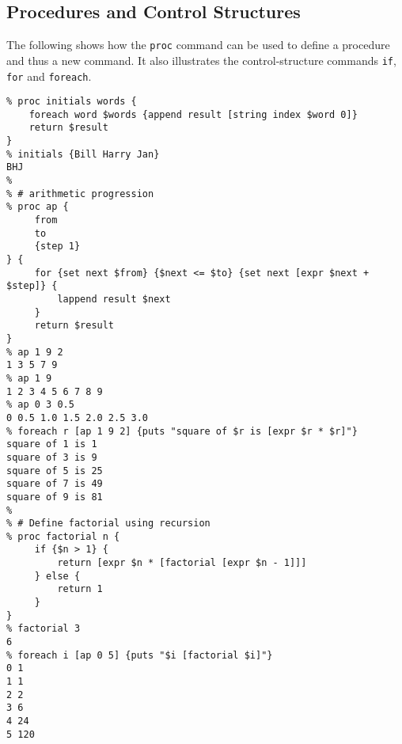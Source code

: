 \subsection{Procedures and Control Structures}
    \label{tcl-log-control}

The following shows how the 
  \texttt{proc} command can be used to define a procedure and thus
  a new command. It also illustrates the control-structure commands 
  \texttt{if}, 
  \texttt{for} and 
  \texttt{foreach}.
  \begin{verbatim}
% proc initials words {
    foreach word $words {append result [string index $word 0]}
    return $result
}
% initials {Bill Harry Jan}
BHJ
% 
% # arithmetic progression
% proc ap {
     from
     to
     {step 1}
} {
     for {set next $from} {$next <= $to} {set next [expr $next + $step]} {
         lappend result $next
     }
     return $result
}
% ap 1 9 2
1 3 5 7 9
% ap 1 9
1 2 3 4 5 6 7 8 9
% ap 0 3 0.5
0 0.5 1.0 1.5 2.0 2.5 3.0
% foreach r [ap 1 9 2] {puts "square of $r is [expr $r * $r]"}
square of 1 is 1
square of 3 is 9
square of 5 is 25
square of 7 is 49
square of 9 is 81
% 
% # Define factorial using recursion
% proc factorial n {
     if {$n > 1} {
         return [expr $n * [factorial [expr $n - 1]]]
     } else {
         return 1
     }
}
% factorial 3
6
% foreach i [ap 0 5] {puts "$i [factorial $i]"}
0 1
1 1
2 2
3 6
4 24
5 120
\end{verbatim}

